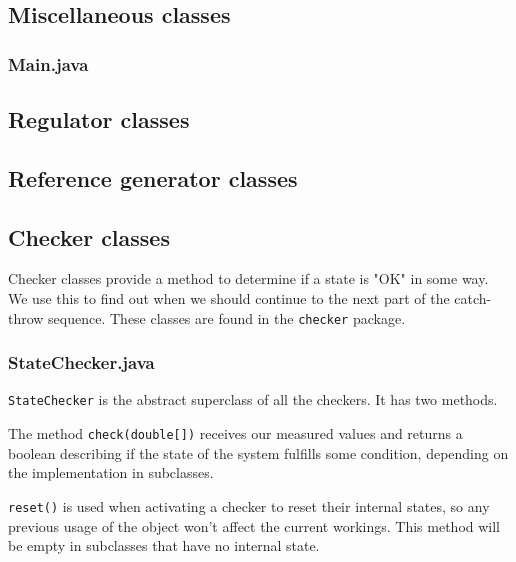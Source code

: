 \documentclass{article}
\begin{document}

\subsection{Miscellaneous classes} 	%

\subsubsection{Main.java}

\subsection{Regulator classes}

\subsection{Reference generator classes}

\subsection{Checker classes}
Checker classes provide a method to determine if a state is "OK" in some way. We use this to find out when we should continue to the next part of the catch-throw sequence. These classes are found in the \texttt{checker} package.
\subsubsection{StateChecker.java}
\texttt{StateChecker} is the abstract superclass of all the checkers. It has two methods.

The method \texttt{check(double[])} receives our measured values and returns a boolean describing if the state of the system fulfills some condition, depending on the implementation in subclasses.

\texttt{reset()} is used when activating a checker to reset their internal states, so any previous usage of the object won't  affect the current workings. This method will be empty in subclasses that have no internal state.
\end{document}
